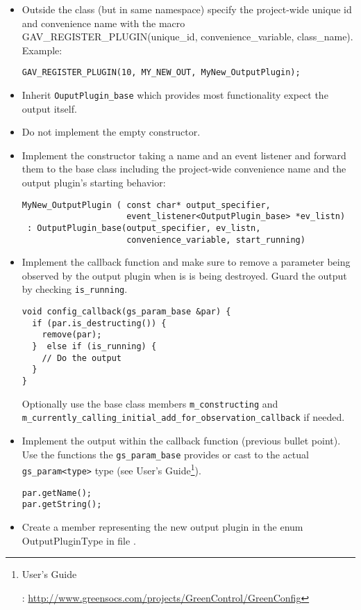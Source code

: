 \begin{itemize}
  \item Outside the class (but in same namespace) specify the project-wide unique id and convenience name with the macro {\sffamily GAV\_REGISTER\_PLUGIN(unique\_id, convenience\_variable, class\_name)}. \newline
     Example:
    \begin{lstlisting}
GAV_REGISTER_PLUGIN(10, MY_NEW_OUT, MyNew_OutputPlugin);
    \end{lstlisting}
  \item Inherit \lstinline|OuputPlugin_base| which provides most functionality expect the output itself.
  \item Do not implement the empty constructor.
  \item Implement the constructor taking a name and an event listener and forward them to the base class including the project-wide convenience name and the output plugin's starting behavior:
    \begin{lstlisting}
MyNew_OutputPlugin ( const char* output_specifier, 
                     event_listener<OutputPlugin_base> *ev_listn)
 : OutputPlugin_base(output_specifier, ev_listn, 
                     convenience_variable, start_running)
    \end{lstlisting}
  \item Implement the callback function and make sure to remove a parameter being observed by the output plugin when is is being destroyed. Guard the output by checking \lstinline|is_running|.
    \begin{lstlisting}
void config_callback(gs_param_base &par) {
  if (par.is_destructing()) {
    remove(par);
  }  else if (is_running) {
    // Do the output
  }
}
    \end{lstlisting}
    Optionally use the base class members \lstinline|m_constructing| and \lstinline|m_currently_calling_initial_add_for_observation_callback| if needed.
  \item Implement the output within the callback function (previous bullet point). Use the functions the \lstinline|gs_param_base| provides or cast to the actual \lstinline|gs_param<type>| type (see \GreenConfig User's Guide\footnote{\hypertarget{GCnfUsersGuide08target}{\GreenConfig User's Guide}: \url{http://www.greensocs.com/projects/GreenControl/GreenConfig}}).
    \begin{lstlisting}
par.getName();
par.getString(); 
    \end{lstlisting}
  \item Create a member representing the new output plugin in the enum {\sffamily OutputPluginType} in file .

\end{itemize}
